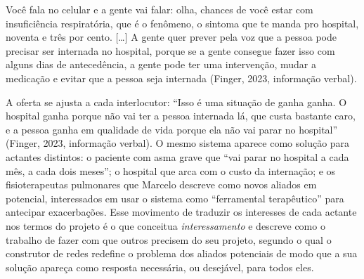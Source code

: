 \begin{citacaoabnt}
Você fala no celular e a gente vai falar: olha, chances de você estar com insuficiência respiratória, que é o fenômeno, o sintoma que te manda pro hospital, noventa e três por cento. [\ldots] A gente quer prever pela voz que a pessoa pode precisar ser internada no hospital, porque se a gente consegue fazer isso com alguns dias de antecedência, a gente pode ter uma intervenção, mudar a medicação e evitar que a pessoa seja internada (Finger, 2023, informação verbal).
\end{citacaoabnt}

A oferta se ajusta a cada interlocutor: \enquote{Isso é uma situação de ganha ganha. O hospital ganha porque não vai ter a pessoa internada lá, que custa bastante caro, e a pessoa ganha em qualidade de vida porque ela não vai parar no hospital} (Finger, 2023, informação verbal). O mesmo sistema aparece como solução para actantes distintos: o paciente com asma grave que \enquote{vai parar no hospital a cada mês, a cada dois meses}; o hospital que arca com o custo da internação; e os fisioterapeutas pulmonares que Marcelo descreve como novos aliados em potencial, interessados em usar o sistema como \enquote{ferramental terapêutico} para antecipar exacerbações. Esse movimento de traduzir os interesses de cada actante nos termos do projeto é o que \textcite{Callon1986Mapping} conceitua \textit{interessamento} e \textcite{Latour2011CienciaEmAcao} descreve como o trabalho de fazer com que outros precisem do seu projeto, segundo o qual o construtor de redes redefine o problema dos aliados potenciais de modo que a sua solução apareça como resposta necessária, ou desejável, para todos eles.

